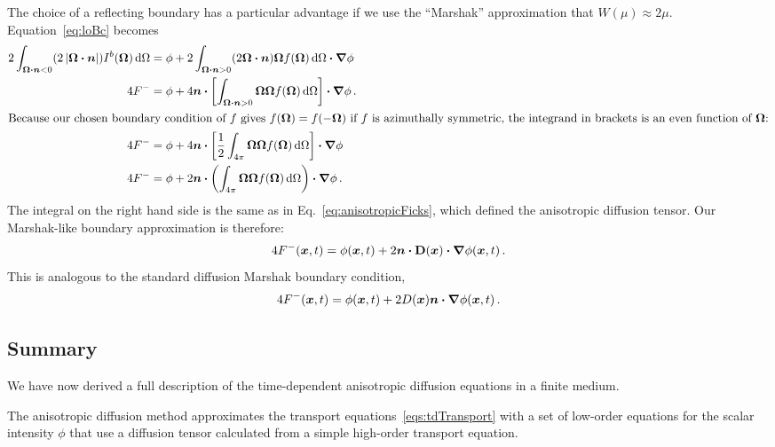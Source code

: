 The choice of a reflecting boundary has a particular advantage if we use the
``Marshak'' approximation
that $W(\mu)\approx 2\mu$. Equation~\eqref{eq:loBc} becomes
\begin{align*}
  2\int_{\bm{\Omega}\bm{\cdot} \bm{n} < 0}
  ( 2\left| \bm{\Omega} \bm{\cdot} \bm{n} \right| ) I^b(\bm{\Omega}) \mathop{}\!\mathrm{d}\Omega
  &= \phi
  + 2\int_{\bm{\Omega}\bm{\cdot} \bm{n} > 0} ( 2\bm{\Omega} \bm{\cdot} \bm{n} )
  \bm{\Omega} f(\bm{\Omega}) \mathop{}\!\mathrm{d}\Omega \bm{\cdot} \bm{\nabla} \phi
  \\
  4 F^-
  &= \phi
  + 4 \bm{n} \bm{\cdot} \left[ \int_{\bm{\Omega}\bm{\cdot} \bm{n} > 0} \bm{\Omega}
  \bm{\Omega} f(\bm{\Omega}) \mathop{}\!\mathrm{d}\Omega \right] \bm{\cdot} \bm{\nabla} \phi \,.
  \\ 
  \intertext{Because our chosen boundary condition of $f$ gives
  $f(\bm{\Omega})=f(-\bm{\Omega})$ if $f$ is azimuthally symmetric, the
  integrand in brackets is an even function of $\bm{\Omega}$:}
  4 F^-
  &= \phi
  + 4 \bm{n} \bm{\cdot}  \left[ \frac{1}{2} \int_{4\pi}
  \bm{\Omega} \bm{\Omega} f(\bm{\Omega}) \mathop{}\!\mathrm{d}\Omega \right] \bm{\cdot} \bm{\nabla} \phi
  \\
  4 F^-
  &= \phi
  + 2 \bm{n} \bm{\cdot} \left( \int_{4\pi}
  \bm{\Omega} \bm{\Omega} f(\bm{\Omega}) \mathop{}\!\mathrm{d}\Omega \right) \bm{\cdot} \bm{\nabla} \phi \,.
\end{align*}
The integral on the right hand side is the same as in
  Eq.~\eqref{eq:anisotropicFicks}, which defined the anisotropic diffusion
  tensor. Our Marshak-like boundary approximation is therefore:
\begin{equation}\label{eq:marshakAd}
  4 F^-(\bm{x}, t)
  = \phi(\bm{x}, t)
  + 2 \bm{n} \bm{\cdot} \mathbf{D}(\bm{x}) \bm{\cdot} \bm{\nabla} \phi(\bm{x}, t) \,.
\end{equation}
This is analogous to the standard diffusion Marshak boundary condition,
\begin{equation*}
  4 F^-(\bm{x}, t) = \phi(\bm{x}, t)
  + 2  D(\bm{x}) \bm{n} \bm{\cdot} \bm{\nabla} \phi(\bm{x}, t)\,.
\end{equation*}

\subsection{Summary}
We have now derived a full description of the time-dependent anisotropic
diffusion equations in a finite medium. 

The anisotropic diffusion method approximates the transport
equations~\eqref{eqs:tdTransport} with a set of low-order equations for the
scalar intensity $\phi$ that use a diffusion tensor calculated from a
simple high-order transport equation.

